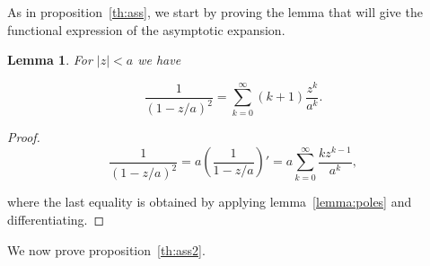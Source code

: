 \documentclass{article}
\newtheorem{lemma}{Lemma}
\begin{document}
As in proposition~\ref{th:ass}, we start by proving the lemma that will
give the functional expression of the asymptotic expansion.

\begin{lemma}
\label{lemma:poles2}
For $|z| < a$ we have

\begin{equation}
\label{eq:poles2}
\frac{1}{(1-z/a)^2} = \sum_{k=0}^\infty (k+1)\frac{z^k}{a^k}.
\end{equation}
\end{lemma}

\begin{proof}
\begin{equation*}
\frac{1}{(1-z/a)^2} = a \left( \frac{1}{1-z/a} \right)'
= a \sum_{k=0}^\infty \frac{kz^{k-1}}{a^k},
\end{equation*}

\noindent
where the last equality is obtained by applying lemma~\ref{lemma:poles}
and differentiating.
\end{proof}

We now prove proposition~\ref{th:ass2}.
\end{document}
